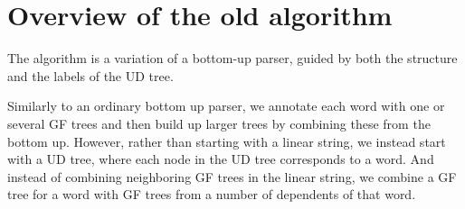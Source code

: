 %
%
%
%

\section{Overview of the old algorithm}\label{sec:overview-of-algorithm}

The algorithm is a variation of a bottom-up parser, guided by both the structure and the labels of the UD tree.

Similarly to an ordinary bottom up parser, we annotate each word with one or several GF trees and then build up larger trees by combining these from the bottom up.
However, rather than starting with a linear string, we instead start with a UD tree, where each node in the UD tree corresponds to a word. And instead of combining neighboring GF trees in the linear string, we combine a GF tree for a word with GF trees from a number of dependents of that word.

